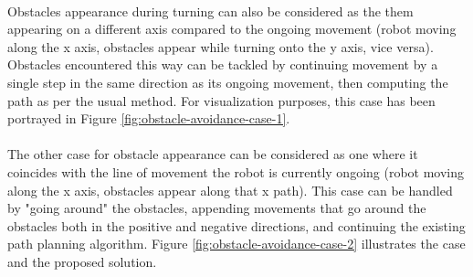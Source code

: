 \paragraph*{}
Obstacles appearance during turning can also be considered as the them appearing on a different axis compared to the ongoing movement (robot moving along the x axis, obstacles appear while turning onto the y axis, vice versa). Obstacles encountered this way can be tackled by continuing movement by a single step in the same direction as its ongoing movement, then computing the path as per the usual method. For visualization purposes, this case has been portrayed in Figure \ref{fig:obstacle-avoidance-case-1}.


\paragraph*{}
The other case for obstacle appearance can be considered as one where it coincides with the line of movement the robot is currently ongoing (robot moving along the x axis, obstacles appear along that x path). This case can be handled by "going around" the obstacles, appending movements that go around the obstacles both in the positive and negative directions, and continuing the existing path planning algorithm. Figure \ref{fig:obstacle-avoidance-case-2} illustrates the case and the proposed solution.


